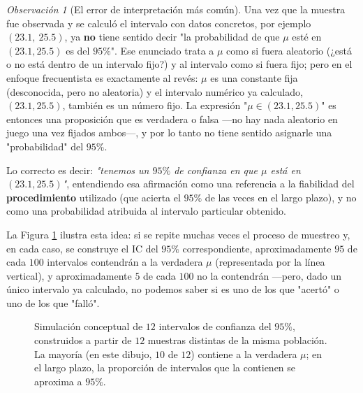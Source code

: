 \documentclass[11pt,a4paper]{article}
\theoremstyle{plain}
\theoremstyle{definition}
\theoremstyle{remark}
\newtheorem{observacion}[teorema]{Observación}
\begin{document}
\begin{observacion}[El error de interpretación más común]
Una vez que la muestra fue observada y se calculó el intervalo con datos concretos, por ejemplo $(23.1,\ 25.5)$, ya \textbf{no} tiene sentido decir "la probabilidad de que $\mu$ esté en $(23.1,25.5)$ es del $95\%$". Ese enunciado trata a $\mu$ como si fuera aleatorio (¿está o no está dentro de un intervalo fijo?) y al intervalo como si fuera fijo; pero en el enfoque frecuentista es exactamente al revés: $\mu$ es una constante fija (desconocida, pero no aleatoria) y el intervalo numérico ya calculado, $(23.1,25.5)$, también es un número fijo. La expresión "$\mu \in (23.1,25.5)$" es entonces una proposición que es verdadera o falsa —no hay nada aleatorio en juego una vez fijados ambos—, y por lo tanto no tiene sentido asignarle una "probabilidad" del $95\%$.

Lo correcto es decir: \emph{"tenemos un $95\%$ de confianza en que $\mu$ está en $(23.1,25.5)$"}, entendiendo esa afirmación como una referencia a la fiabilidad del \textbf{procedimiento} utilizado (que acierta el $95\%$ de las veces en el largo plazo), y no como una probabilidad atribuida al intervalo particular obtenido.
\end{observacion}

La Figura \ref{fig:muchosIC} ilustra esta idea: si se repite muchas veces el proceso de muestreo y, en cada caso, se construye el IC del $95\%$ correspondiente, aproximadamente $95$ de cada $100$ intervalos contendrán a la verdadera $\mu$ (representada por la línea vertical), y aproximadamente $5$ de cada $100$ no la contendrán —pero, dado un único intervalo ya calculado, no podemos saber si es uno de los que "acertó" o uno de los que "falló".

\begin{figure}[h]
\centering
{}
\caption{Simulación conceptual de $12$ intervalos de confianza del $95\%$, construidos a partir de $12$ muestras distintas de la misma población. La mayoría (en este dibujo, $10$ de $12$) contiene a la verdadera $\mu$; en el largo plazo, la proporción de intervalos que la contienen se aproxima a $95\%$.}
\label{fig:muchosIC}
\end{figure}
\end{document}
